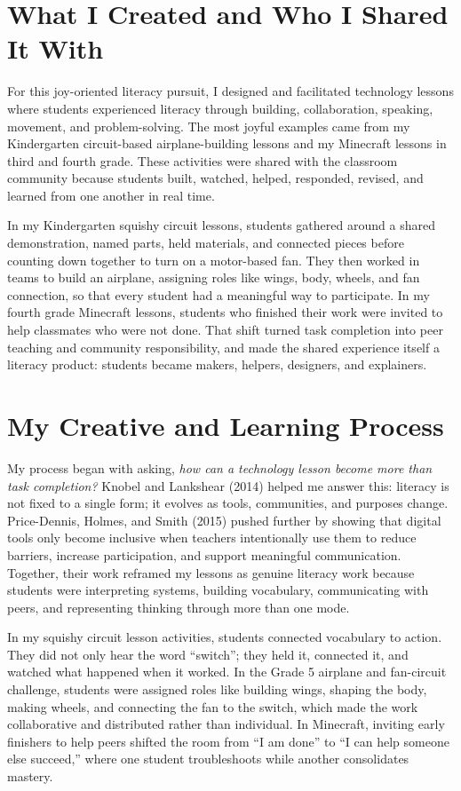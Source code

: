 \documentclass[11pt]{article}
\begin{document}
\doublespacing

\section*{What I Created and Who I Shared It With}

For this joy-oriented literacy pursuit, I designed and facilitated technology lessons where students experienced literacy through building, collaboration, speaking, movement, and problem-solving. The most joyful examples came from my Kindergarten circuit-based airplane-building lessons and my Minecraft lessons in third and fourth grade. These activities were shared with the classroom community because students built, watched, helped, responded, revised, and learned from one another in real time.

In my Kindergarten squishy circuit lessons, students gathered around a shared demonstration, named parts, held materials, and connected pieces before counting down together to turn on a motor-based fan. They then worked in teams to build an airplane, assigning roles like wings, body, wheels, and fan connection, so that every student had a meaningful way to participate. In my fourth grade Minecraft lessons, students who finished their work were invited to help classmates who were not done. That shift turned task completion into peer teaching and community responsibility, and made the shared experience itself a literacy product: students became makers, helpers, designers, and explainers.

\section*{My Creative and Learning Process}

My process began with asking, \textit{how can a technology lesson become more than task completion?} Knobel and Lankshear (2014) helped me answer this: literacy is not fixed to a single form; it evolves as tools, communities, and purposes change. Price-Dennis, Holmes, and Smith (2015) pushed further by showing that digital tools only become inclusive when teachers intentionally use them to reduce barriers, increase participation, and support meaningful communication. Together, their work reframed my lessons as genuine literacy work because students were interpreting systems, building vocabulary, communicating with peers, and representing thinking through more than one mode.

In my squishy circuit lesson activities, students connected vocabulary to action. They did not only hear the word ``switch''; they held it, connected it, and watched what happened when it worked. In the Grade 5 airplane and fan-circuit challenge, students were assigned roles like building wings, shaping the body, making wheels, and connecting the fan to the switch, which made the work collaborative and distributed rather than individual. In Minecraft, inviting early finishers to help peers shifted the room from ``I am done'' to ``I can help someone else succeed,'' where one student troubleshoots while another consolidates mastery.
\end{document}
